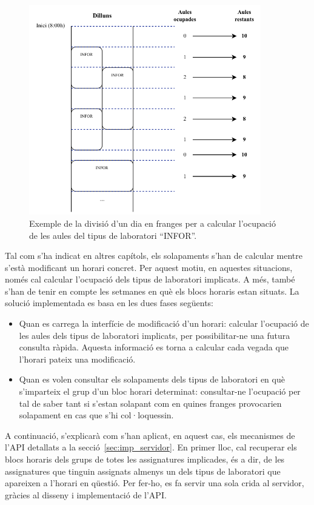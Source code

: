 \documentclass[a4paper,12pt]{ThesisStyle}
\begin{document}
\begin{figure}[H]
  \centering
  \includegraphics[width=0.9\textwidth]{assets/figs/franges.pdf}
  \caption{\label{img:franges} Exemple de la divisió d'un dia en franges per a calcular l'ocupació de les aules del tipus de laboratori ``INFOR''.}
\end{figure}

Tal com s'ha indicat en altres capítols, els solapaments s'han de calcular mentre s'està modificant un horari concret. Per aquest motiu, en aquestes situacions, només cal calcular l'ocupació dels tipus de laboratori implicats. A més, també s'han de tenir en compte les setmanes en què els blocs horaris estan situats. La solució implementada es basa en les dues fases següents:

\begin{itemize}
  \item Quan es carrega la interfície de modificació d'un horari: calcular l'ocupació de les aules dels tipus de laboratori implicats, per possibilitar-ne una futura consulta ràpida. Aquesta informació es torna a calcular cada vegada que l'horari pateix una modificació.
  \item Quan es volen consultar els solapaments dels tipus de laboratori en què s'imparteix el grup d'un bloc horari determinat: consultar-ne l'ocupació per tal de saber tant si s'estan solapant com en quines franges provocarien solapament en cas que s'hi col·loquessin.
\end{itemize}

A continuació, s'explicarà com s'han aplicat, en aquest cas, els mecanismes de l'API detallats a la secció~\ref{sec:imp_servidor}. En primer lloc, cal recuperar els blocs horaris dels grups de totes les assignatures implicades, és a dir, de les assignatures que tinguin assignats almenys un dels tipus de laboratori que apareixen a l'horari en qüestió. Per fer-ho, es fa servir una sola crida al servidor, gràcies al disseny i implementació de l'API.
\end{document}
